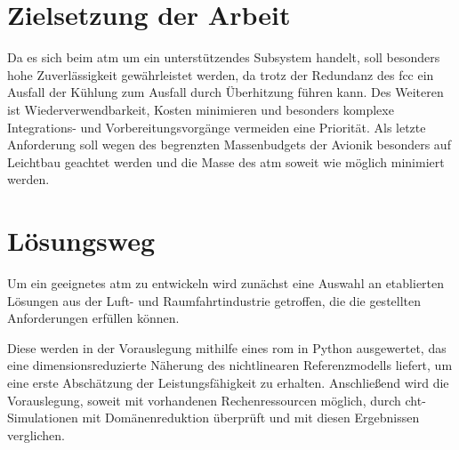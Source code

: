\section{Zielsetzung der Arbeit}

Da es sich beim \ac{atm} um ein unterstützendes Subsystem handelt, soll besonders hohe Zuverlässigkeit gewährleistet werden, da trotz der
Redundanz des \ac{fcc} ein Ausfall der Kühlung zum Ausfall durch Überhitzung führen kann.
Des Weiteren ist Wiederverwendbarkeit, Kosten minimieren und besonders komplexe Integrations- und Vorbereitungsvorgänge
vermeiden eine Priorität.
Als letzte Anforderung soll wegen des begrenzten Massenbudgets der Avionik
besonders auf Leichtbau geachtet werden und die Masse des \ac{atm} soweit wie möglich minimiert werden.

\section{Lösungsweg}

Um ein geeignetes \ac{atm} zu entwickeln wird zunächst eine Auswahl an etablierten Lösungen aus der Luft- und Raumfahrtindustrie
getroffen, die die gestellten Anforderungen erfüllen können.

Diese werden in der Vorauslegung mithilfe eines \ac{rom} in Python ausgewertet, das eine dimensionsreduzierte Näherung des nichtlinearen Referenzmodells liefert, um eine erste Abschätzung der Leistungsfähigkeit zu erhalten.
Anschließend wird die Vorauslegung, soweit mit vorhandenen Rechenressourcen möglich, durch \ac{cht}-Simulationen mit Domänenreduktion
überprüft und mit diesen Ergebnissen verglichen.